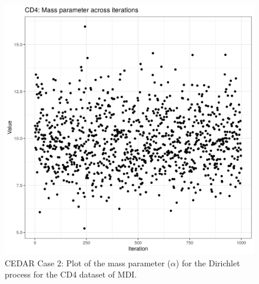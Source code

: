 \documentclass[14pt]{extarticle} %
\begin{document}
	
	\begin{figure}[h]
		\centering
		\includegraphics[scale=0.75]{Images/Biology_data/Set_1000/All_datasets/Mass_parameter_plots/CD4.png}
		\caption{CEDAR Case 2: Plot of the mass parameter ($\alpha$) for the Dirichlet process for the CD4 dataset of MDI.}
		\label{fig:results:cedar_2:mdi_cd4_mass_parameter_plot}
	\end{figure}
	
	
	
	
\end{document}
